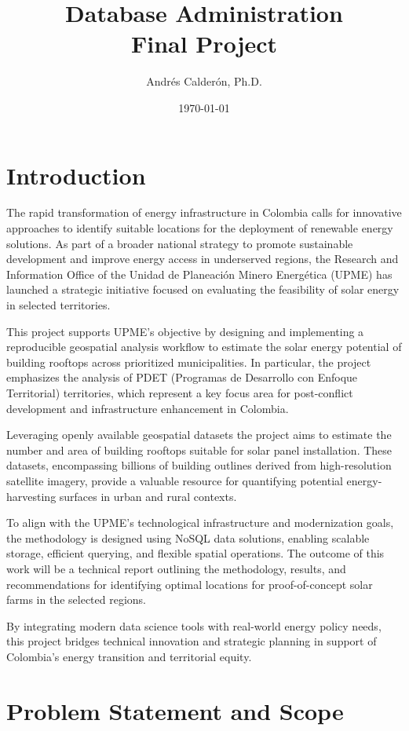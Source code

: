 \documentclass[11pt]{article}
\title{Database Administration \\ Final Project}
\author{Andrés Calderón, Ph.D.}
\date{\today}
\begin{document}
\maketitle

\section{Introduction}

The rapid transformation of energy infrastructure in Colombia calls for innovative approaches to identify suitable locations for the deployment of renewable energy solutions. As part of a broader national strategy to promote sustainable development and improve energy access in underserved regions, the Research and Information Office of the Unidad de Planeación Minero Energética (UPME) has launched a strategic initiative focused on evaluating the feasibility of solar energy in selected territories.

This project supports UPME’s objective by designing and implementing a reproducible geospatial analysis workflow to estimate the solar energy potential of building rooftops across prioritized municipalities. In particular, the project emphasizes the analysis of PDET (Programas de Desarrollo con Enfoque Territorial) territories, which represent a key focus area for post-conflict development and infrastructure enhancement in Colombia.

Leveraging openly available geospatial datasets the project aims to estimate the number and area of building rooftops suitable for solar panel installation. These datasets, encompassing billions of building outlines derived from high-resolution satellite imagery, provide a valuable resource for quantifying potential energy-harvesting surfaces in urban and rural contexts.

To align with the UPME’s technological infrastructure and modernization goals, the methodology is designed using NoSQL data solutions, enabling scalable storage, efficient querying, and flexible spatial operations. The outcome of this work will be a technical report outlining the methodology, results, and recommendations for identifying optimal locations for proof-of-concept solar farms in the selected regions.

By integrating modern data science tools with real-world energy policy needs, this project bridges technical innovation and strategic planning in support of Colombia’s energy transition and territorial equity.

\section{Problem Statement and Scope}
\end{document}

